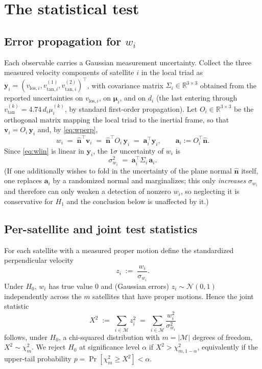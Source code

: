 \documentclass{amsart}
\theoremstyle{definition}
\begin{document}
\section{The statistical test}

\subsection{Error propagation for $w_i$}
Each observable carries a Gaussian measurement uncertainty. Collect the
three measured velocity components of satellite $i$ in the local triad as
$\bm y_i=(v_{\mathrm{los},i},v_{\mathrm{tan},i}^{(1)},v_{\mathrm{tan},i}^{(2)})^{\!\top}$,
with covariance matrix $\Sigma_i\in\mathbb R^{3\times3}$ obtained from the
reported uncertainties on $v_{\mathrm{los},i}$, on $\bm\mu_i$, and on $d_i$
(the last entering through $v_{\mathrm{tan}}^{(k)}=4.74\,d_i\mu^{(k)}_i$, by
standard first-order propagation). Let $O_i\in\mathbb R^{3\times3}$ be the
orthogonal matrix mapping the local triad to the inertial frame, so that
$\bm v_i = O_i\,\bm y_i$ and, by \eqref{eq:wperp},
\begin{equation}\label{eq:wlin}
  w_i \;=\; \hat{\bm n}^{\!\top}\bm v_i
       \;=\; \hat{\bm n}^{\!\top}O_i\,\bm y_i
       \;=\; \bm a_i^{\!\top}\bm y_i,
  \qquad \bm a_i := O_i^{\!\top}\hat{\bm n}.
\end{equation}
Since \eqref{eq:wlin} is linear in $\bm y_i$, the $1\sigma$ uncertainty of
$w_i$ is
\begin{equation}\label{eq:sigmaw}
  \sigma_{w_i}^2 \;=\; \bm a_i^{\!\top}\Sigma_i\,\bm a_i .
\end{equation}
(If one additionally wishes to fold in the uncertainty of the plane normal
$\hat{\bm n}$ itself, one replaces $\bm a_i$ by a randomized normal and
marginalizes; this only \emph{increases} $\sigma_{w_i}$ and therefore can
only weaken a detection of nonzero $w_i$, so neglecting it is conservative
for $H_1$ and the conclusion below is unaffected by it.)

\subsection{Per-satellite and joint test statistics}
For each satellite with a measured proper motion define the standardized
perpendicular velocity
\begin{equation}\label{eq:z}
  z_i \;:=\; \frac{w_i}{\sigma_{w_i}} .
\end{equation}
Under $H_0$, $w_i$ has true value $0$ and (Gaussian errors)
$z_i\sim\mathcal N(0,1)$ independently across the $m$ satellites that have
proper motions. Hence the joint statistic
\begin{equation}\label{eq:chi2}
  X^2 \;:=\; \sum_{i\in\mathcal M} z_i^2
        \;=\; \sum_{i\in\mathcal M}\frac{w_i^2}{\sigma_{w_i}^2}
\end{equation}
follows, under $H_0$, a chi-squared distribution with $m=|\mathcal M|$
degrees of freedom, $X^2\sim\chi^2_m$. We reject $H_0$ at significance
level $\alpha$ if $X^2 > \chi^2_{m,1-\alpha}$, equivalently if the
upper-tail probability $p=\Pr[\chi^2_m\ge X^2]<\alpha$.
\end{document}

